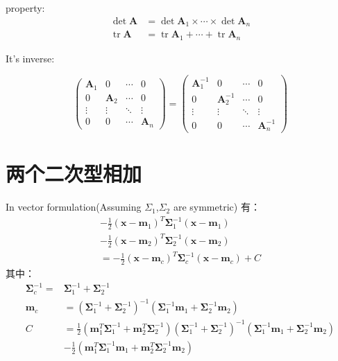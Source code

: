 \documentclass[
]{book}
\theoremstyle{definition}
\theoremstyle{definition}
\theoremstyle{definition}
\theoremstyle{remark}
\begin{document}
property:
\[
\begin{aligned} \operatorname{det} \mathbf{A} &=\operatorname{det} \mathbf{A}_{1} \times \cdots \times \operatorname{det} \mathbf{A}_{n} \\ \operatorname{tr} \mathbf{A} &=\operatorname{tr} \mathbf{A}_{1}+\cdots+\operatorname{tr} \mathbf{A}_{n} \end{aligned}
\]

It's inverse:

\[
\left( \begin{array}{cccc}{\mathbf{A}_{1}} & {0} & {\cdots} & {0} \\ {0} & {\mathbf{A}_{2}} & {\cdots} & {0} \\ {\vdots} & {\vdots} & {\ddots} & {\vdots} \\ {0} & {0} & {\cdots} & {\mathbf{A}_{n}}\end{array}\right)=\left( \begin{array}{cccc}{\mathbf{A}_{1}^{-1}} & {0} & {\cdots} & {0} \\ {0} & {\mathbf{A}_{2}^{-1}} & {\cdots} & {0} \\ {\vdots} & {\vdots} & {\ddots} & {\vdots} \\ {0} & {0} & {\cdots} & {\mathbf{A}_{n}^{-1}}\end{array}\right)
\]

\hypertarget{sumSquare}{%
\section{两个二次型相加}\label{sumSquare}}

In vector formulation(Assuming \(\Sigma_1\),\(\Sigma_2\) are symmetric)
有：
\[
\begin{array}{c}{-\frac{1}{2}\left(\mathbf{x}-\mathbf{m}_{1}\right)^{T} \mathbf{\Sigma}_{1}^{-1}\left(\mathbf{x}-\mathbf{m}_{1}\right)} \\ {-\frac{1}{2}\left(\mathbf{x}-\mathbf{m}_{2}\right)^{T} \mathbf{\Sigma}_{2}^{-1}\left(\mathbf{x}-\mathbf{m}_{2}\right)} \\ {=-\frac{1}{2}\left(\mathbf{x}-\mathbf{m}_{c}\right)^{T} \mathbf{\Sigma}_{c}^{-1}\left(\mathbf{x}-\mathbf{m}_{c}\right)+C}\end{array}
\]
其中：
\[
\begin{aligned} \mathbf{\Sigma}_{c}^{-1}=& \mathbf{\Sigma}_{1}^{-1}+\mathbf{\Sigma}_{2}^{-1} \\ \mathbf{m}_{c} &=\left(\mathbf{\Sigma}_{1}^{-1}+\mathbf{\Sigma}_{2}^{-1}\right)^{-1}\left(\mathbf{\Sigma}_{1}^{-1} \mathbf{m}_{1}+\mathbf{\Sigma}_{2}^{-1} \mathbf{m}_{2}\right) \\ C &=\frac{1}{2}\left(\mathbf{m}_{1}^{T} \mathbf{\Sigma}_{1}^{-1}+\mathbf{m}_{2}^{T} \mathbf{\Sigma}_{2}^{-1}\right)\left(\mathbf{\Sigma}_{1}^{-1}+\mathbf{\Sigma}_{2}^{-1}\right)^{-1}\left(\mathbf{\Sigma}_{1}^{-1} \mathbf{m}_{1}+\mathbf{\Sigma}_{2}^{-1} \mathbf{m}_{2}\right) \\ &-\frac{1}{2}\left(\mathbf{m}_{1}^{T} \mathbf{\Sigma}_{1}^{-1} \mathbf{m}_{1}+\mathbf{m}_{2}^{T} \mathbf{\Sigma}_{2}^{-1} \mathbf{m}_{2}\right) \end{aligned}
\]
\end{document}
